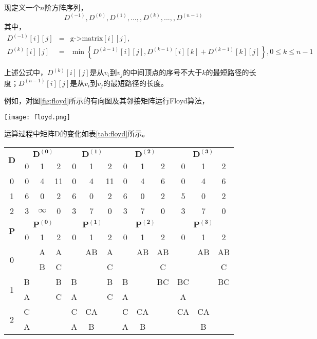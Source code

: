 现定义一个$n$阶方阵序列，
$$
D^{(-1)}, D^{(0)} , D^{(1)},..., , D^{(k)},..., , D^{(n-1)}
$$
其中，
\begin{eqnarray}
D^{(-1)}[i][j] &=& \text{g->matrix}[i][j],  \nonumber \\
D^{(k)}[i][j] &=& \min\left\{D^{(k-1)}[i][j], D^{(k-1)}[i][k] + D^{(k-1)}[k][j]\right\},0 \leq k \leq n-1 \nonumber
\end{eqnarray}

上述公式中，$D^{(k)}[i][j]$是从$v_i$到$v_j$的中间顶点的序号不大于$k$的最短路径的长度；$D^{(n-1)}[i][j]$是从$v_i$到$v_j$的最短路径的长度。

例如，对图\ref{fig:floyd}所示的有向图及其邻接矩阵运行Floyd算法，

\begin{center}
\texttt{[image: floyd.png]}\\
\label{fig:floyd}
\end{center}

运算过程中矩阵D的变化如表\ref{tab:floyd}所示。

\begin{center}
\label{tab:floyd}
\begin{tabular}{|c|ccc|ccc|ccc|ccc|}
\hline
\multirow{2}{*}{$\mathbf{D}$} & \multicolumn{3}{|c|}{$\mathbf{D^{(0)}}$} & \multicolumn{3}{|c|}{$\mathbf{D^{(1)}}$} & \multicolumn{3}{|c|}{$\mathbf{D^{(2)}}$} & \multicolumn{3}{|c|}{$\mathbf{D^{(3)}}$} \\
 & 0 & 1 & 2 & 0 & 1 & 2 & 0 & 1 & 2 & 0 & 1 & 2 \\
\hline
0 & 0 & 4 & 11 & 0 & 4 & 11 & 0 & 4 & 6 & 0 & 4 & 6 \\
1 & 6 & 0 & 2 & 6 & 0 & 2 & 6 & 0 & 2 & 5 & 0 & 2 \\
2 & 3 & $\infty$ & 0 & 3 & 7 & 0 & 3 & 7 & 0 & 3 & 7 & 0 \\
\hline
\multirow{2}{*}{$\mathbf{P}$} & \multicolumn{3}{|c|}{$\mathbf{P^{(0)}}$} & \multicolumn{3}{|c|}{$\mathbf{P^{(1)}}$} & \multicolumn{3}{|c|}{$\mathbf{P^{(2)}}$} & \multicolumn{3}{|c|}{$\mathbf{P^{(3)}}$} \\
 & 0 & 1 & 2 & 0 & 1 & 2 & 0 & 1 & 2 & 0 & 1 & 2 \\
\hline
\multirow{2}{*}{0} & & A & A & & AB & A & & AB & AB & & AB & AB \\
                   & & B & C & & & C & & & C & & & C \\
\hline
\multirow{2}{*}{1} & B & & B & B & & B & B & & BC & BC & & BC \\
                   & A & & C & A & & C & A & & & A & & \\
\hline
\multirow{2}{*}{2} & C & & & C & CA & & C & CA & & CA & CA & \\
                   & A & & & A & B & & A & B & & & B & \\
\hline
\end{tabular}
\end{center}

